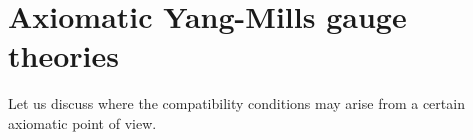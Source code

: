 \documentclass[a4paper,oneside,11pt,bibliography=totoc]{scrartcl}
\theoremstyle{plain}
\theoremstyle{remark}
\theoremstyle{definition}
\begin{document}





\section{Axiomatic Yang-Mills gauge theories}

Let us discuss where the compatibility conditions may arise from a certain axiomatic point of view.
\end{document}
